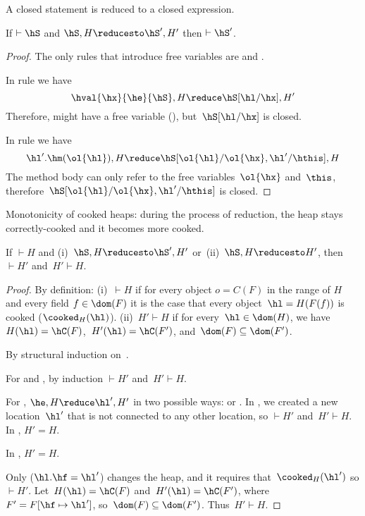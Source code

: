 A closed statement is reduced to a closed expression.
\begin{lemma}
\label{Lemma:closed}
If $\vdash \hS$ and $\hS,H \reducesto \hS',H'$ then $\vdash \hS'$.
\end{lemma}
\begin{proof}
The only rules that introduce free variables are 
    and .

In rule  we have \[
    \hval{\hx}{\he}{\hS},H \reduce \hS[\hl/\hx], H'
\]
Therefore, \hS might have a free variable (\hx), but~$\hS[\hl/\hx]$ is closed.

In rule  we have \[
    \hl'.\hm(\ol{\hl}),H \reduce \hS[\ol{\hl}/\ol{\hx},\hl'/\hthis],H
\]
The method body can only refer to the free variables~$\ol{\hx}$ and~$\this$,
    therefore~$\hS[\ol{\hl}/\ol{\hx},\hl'/\hthis]$ is closed.
\end{proof}



Monotonicity of cooked heaps: during the process of reduction, the heap stays correctly-cooked and it becomes more cooked.
\begin{lemma}
\label{Lemma:correctly-cooked}
If $\vdash H$ and (i)~$\hS,H \reducesto \hS',H'$ or~(ii)~$\hS,H \reducesto H'$, then $\vdash H'$ and~$H' \vdash H$.
\end{lemma}
\begin{proof}
By definition:
    (i)~$\vdash H$ if for every object $o=C(F)$ in the range of $H$ and
    every field $f \in \dom(F)$ it is the case that every object~$\hl=H(F(f))$ is cooked ($\cooked_H(\hl)$).
    (ii)~$H' \vdash H$
    if for every~$\hl \in \dom(H)$, we have~$H(\hl)=\hC(F)$,~$H'(\hl)=\hC(F')$, and~$\dom(F)\subseteq\dom(F')$.

By structural induction on~\hS.

For  and , by induction $\vdash H'$ and~$H' \vdash H$.

For , $\he,H \reduce \hl',H'$ in two possible ways:  or .
In , we created a new location~$\hl'$ that is not connected to any other location, so $\vdash H'$ and~$H' \vdash H$.
In , $H'=H$.

In , $H'=H$.

Only  ($\hl.\hf=\hl'$) changes the heap, and it requires that~$\cooked_H(\hl')$ so $\vdash H'$.
Let~$H(\hl)=\hC(F)$ and~$H'(\hl)=\hC(F')$, where~$F'=F[ \hf \mapsto \hl']$, so~$\dom(F)\subseteq\dom(F')$.
Thus~$H' \vdash H$.
\end{proof}



